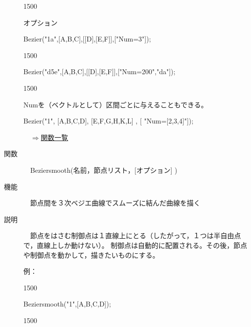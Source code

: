 \documentclass[papersize,a4paper,12pt,uplatex]{jsarticle}
\begin{document}
\begin{description}
\begin{layer}{150}{0}
\end{layer}

オプション

Bezier("1a",[A,B,C],[[D],[E,F]],["Num=3"]);

\vspace{30mm}

\begin{layer}{150}{0}
\end{layer}

Bezier("d5e",[A,B,C],[[D],[E,F]],["Num=200","da"]);

\vspace{35mm}


\begin{layer}{150}{0}
\end{layer}

Numを（ベクトルとして）区間ごとに与えることもできる。

Bezier("1", [A,B,C,D], [E,F,G,H,K,L] , [ "Num=[2,3,4]"]);  

\vspace{30mm}

\begin{flushright}　\hyperlink{functionlist}{$\Rightarrow$関数一覧}\end{flushright}


\hypertarget{beziersmooth}{}
\item[関数]　Beziersmooth(名前，節点リスト，[オプション] )
\item[機能]　節点間を３次ベジエ曲線でスムーズに結んだ曲線を描く
\item[説明]　節点をはさむ制御点は１直線上にとる（したがって，１つは半自由点で，直線上しか動けない）。
制御点は自動的に配置される。その後，節点や制御点を動かして，描きたいものにする。

例：

\begin{layer}{150}{0}
\end{layer}

Beziersmooth("1",[A,B,C,D]);

\vspace{20mm}

\begin{layer}{150}{0}
\end{layer}


\end{description}
\end{document}
